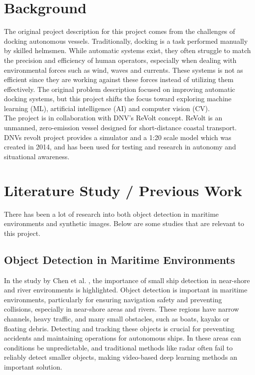 




\section{Background}

The original project description for this project comes from the challenges of docking autonomous vessels. Traditionally, docking is a task performed manually by skilled helmsmen. While automatic systems exist, they often struggle to match the precision and efficiency of human operators, especially when dealing with environmental forces such as wind, waves and currents. These systems is not as efficient since they are working against these forces instead of utilizing them effectively. The original problem description focused on improving automatic docking systems, but this project shifts the focus toward exploring machine learning (ML), artificial intelligence (AI) and computer vision (CV).\\


\noindent The project is in collaboration with DNV's ReVolt concept. ReVolt is an unmanned, zero-emission vessel designed for short-distance coastal transport. DNVs revolt project provides a simulator and a 1:20 scale model which was created in 2014, and has been used for testing and research in autonomy and situational awareness.

\section{Literature Study / Previous Work}

There has been a lot of research into both object detection in maritime environments and synthetic images. Below are some studies that are relevant to this project.

\subsection{Object Detection in Maritime Environments}

In the study by Chen et al. \cite{safety}, the importance of small ship detection in near-shore and river environments is highlighted. Object detection is important in maritime environments, particularly for ensuring navigation safety and preventing collisions, especially in near-shore areas and rivers. These regions have narrow channels, heavy traffic, and many small obstacles, such as boats, kayaks or floating debris. Detecting and tracking these objects is crucial for preventing accidents and maintaining operations for autonomous ships. In these areas can conditions be unpredictable, and traditional methods like radar often fail to reliably detect smaller objects, making video-based deep learning methods an important solution.\\

